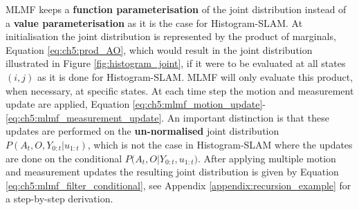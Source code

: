 MLMF keeps a  \textbf{function parameterisation} of the joint distribution instead of a \textbf{value parameterisation} as it is the case 
for Histogram-SLAM. At initialisation the joint distribution is represented by the product of marginals, Equation \ref{eq:ch5:prod_AO}, which 
would result in the joint distribution illustrated in Figure \ref{fig:histogram_joint}, if it were to be evaluated at all states $(i,j)$
as it is done for Histogram-SLAM. MLMF will only evaluate this product, when necessary, at specific states. 
At each time step the motion and measurement update are applied, Equation \ref{eq:ch5:mlmf_motion_update}-\ref{eq:ch5:mlmf_measurement_update}.
An important distinction is that these updates are performed on the \textbf{un-normalised} joint distribution ${P(A_t,O,Y_{0:t}|u_{1:t})}$, which is not the case in Histogram-SLAM where 
the updates are done on the conditional ${P(A_t,O|Y_{0:t},u_{1:t}})$. After applying multiple 
motion and measurement updates the resulting joint distribution is given by Equation \ref{eq:ch5:mlmf_filter_conditional}, see Appendix \ref{appendix:recursion_example}
for a step-by-step derivation. 

